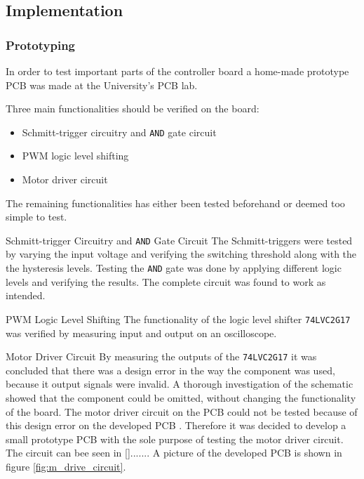 \subsection{Implementation} %
\label{sub:controller_implementation}

\subsubsection{Prototyping}
\label{sub:controller_board_prototyping}
In order to test important parts of the controller board a home-made prototype PCB was made at the University's PCB lab.

Three main functionalities should be verified on the board:

\begin{itemize}
	\item Schmitt-trigger circuitry and \texttt{AND} gate circuit
	\item PWM logic level shifting
	\item Motor driver circuit
\end{itemize}

The remaining functionalities has either been tested beforehand or deemed too simple to test. 

\par{Schmitt-trigger Circuitry and \texttt{AND} Gate Circuit}
The Schmitt-triggers were tested by varying the input voltage and verifying the switching threshold along with the the hysteresis levels. 
Testing the \texttt{AND} gate was done by applying different logic levels and verifying the results.
The complete circuit was found to work as intended.

\par{PWM Logic Level Shifting}
The functionality of the logic level shifter \texttt{74LVC2G17} was verified by measuring input and output on an oscilloscope. 

\par{Motor Driver Circuit}
By measuring the outputs of the \texttt{74LVC2G17} it was concluded that there was a design error in the way the component was used, because it output signals were invalid.
A thorough investigation of the schematic showed that the component could be omitted, without changing the functionality of the board.
The motor driver circuit on the PCB could not be tested because of this design error on the developed PCB .
Therefore it was decided to develop a small prototype PCB with the sole purpose of testing the motor driver circuit.
The circuit can bee seen in \ref{}.......
A picture of the developed PCB is shown in figure \ref{fig:m_drive_circuit}.

